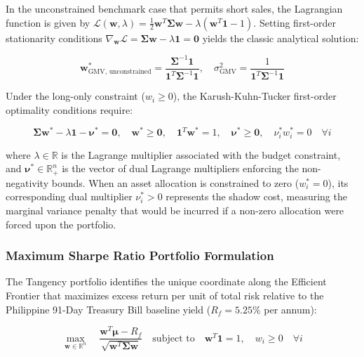 In the unconstrained benchmark case that permits short sales, the Lagrangian function is given by $\mathcal{L}(\mathbf{w}, \lambda) = \frac{1}{2} \mathbf{w}^T \boldsymbol{\Sigma} \mathbf{w} - \lambda (\mathbf{w}^T \mathbf{1} - 1)$. Setting first-order stationarity conditions $\nabla_{\mathbf{w}} \mathcal{L} = \boldsymbol{\Sigma} \mathbf{w} - \lambda \mathbf{1} = \mathbf{0}$ yields the classic analytical solution:

\begin{equation}
  \mathbf{w}_{\text{GMV, unconstrained}}^* = \frac{\boldsymbol{\Sigma}^{-1} \mathbf{1}}{\mathbf{1}^T \boldsymbol{\Sigma}^{-1} \mathbf{1}}, \quad \sigma_{\text{GMV}}^2 = \frac{1}{\mathbf{1}^T \boldsymbol{\Sigma}^{-1} \mathbf{1}}
\end{equation}

Under the long-only constraint ($w_i \ge 0$), the Karush-Kuhn-Tucker first-order optimality conditions require:

\begin{equation}
  \boldsymbol{\Sigma} \mathbf{w}^* - \lambda \mathbf{1} - \boldsymbol{\nu}^* = \mathbf{0}, \quad \mathbf{w}^* \ge \mathbf{0}, \quad \mathbf{1}^T \mathbf{w}^* = 1, \quad \boldsymbol{\nu}^* \ge \mathbf{0}, \quad \nu_i^* w_i^* = 0 \quad \forall i
\end{equation}

where $\lambda \in \mathbb{R}$ is the Lagrange multiplier associated with the budget constraint, and $\boldsymbol{\nu}^* \in \mathbb{R}_+^n$ is the vector of dual Lagrange multipliers enforcing the non-negativity bounds. When an asset allocation is constrained to zero ($w_i^* = 0$), its corresponding dual multiplier $\nu_i^* > 0$ represents the shadow cost, measuring the marginal variance penalty that would be incurred if a non-zero allocation were forced upon the portfolio.

\subsubsection{Maximum Sharpe Ratio Portfolio Formulation}

The Tangency portfolio identifies the unique coordinate along the Efficient Frontier that maximizes excess return per unit of total risk relative to the Philippine 91-Day Treasury Bill baseline yield ($R_f = 5.25\%$ per annum):

\begin{equation}
  \max_{\mathbf{w} \in \mathbb{R}^n} \quad \frac{\mathbf{w}^T \boldsymbol{\mu} - R_f}{\sqrt{\mathbf{w}^T \boldsymbol{\Sigma} \mathbf{w}}} \quad \text{subject to} \quad \mathbf{w}^T \mathbf{1} = 1, \quad w_i \ge 0 \quad \forall i
\end{equation}

